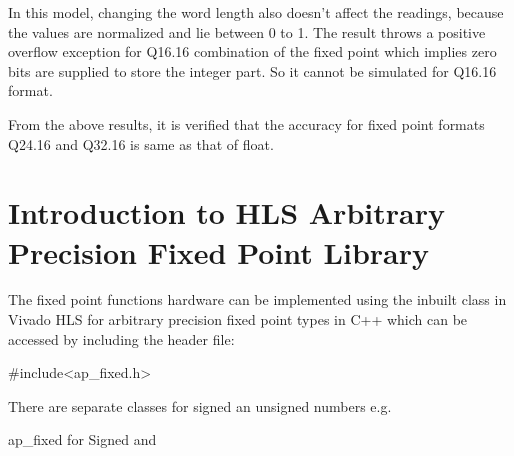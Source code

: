 \vspace{0.25cm}
\noindent In this model, changing the word length also doesn't affect the readings, because the values are normalized and lie between 0 to 1. The result throws a positive overflow exception for Q16.16 combination of the fixed point which implies zero bits are supplied to store the integer part. So it cannot be simulated for Q16.16 format.

\vspace{0.25cm}
\noindent From the above results, it is verified that the accuracy for fixed point formats Q24.16 and Q32.16 is same as that of float.

\section{Introduction to HLS Arbitrary Precision Fixed Point Library}
The fixed point functions hardware can be implemented using the inbuilt class in Vivado HLS for arbitrary precision fixed point types in C++ which can be accessed by including the header file:

\hspace{3cm}\#include\textless ap\_fixed.h\textgreater

\noindent There are separate classes for signed an unsigned numbers e.g.

\hspace{3cm}ap\_fixed for Signed and 

